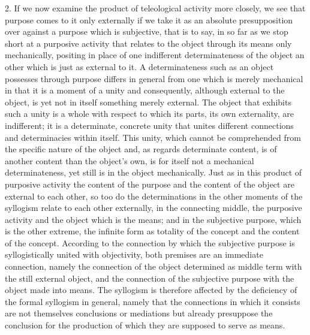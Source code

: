 2. If we now examine the product of
teleological activity more closely,
we see that purpose comes to it only externally
if we take it as an absolute presupposition
over against a purpose which is subjective,
that is to say, in so far as
we stop short at a purposive activity
that relates to the object
through its means only mechanically,
positing in place of one indifferent
determinateness of the object an other
which is just as external to it.
A determinateness such as an object
possesses through purpose differs in
general from one which is merely mechanical
in that it is a moment of
a unity and consequently,
although external to the object,
is yet not in itself
something merely external.
The object that exhibits such a unity is
a whole with respect to which its parts,
its own externality, are indifferent;
it is a determinate, concrete unity that
unites different connections and
determinacies within itself.
This unity, which cannot be comprehended
from the specific nature of the object
and, as regards determinate content,
is of another content than the object's own,
is for itself not a mechanical determinateness,
yet still is in the object mechanically.
Just as in this product of purposive activity
the content of the purpose
and the content of the object are
external to each other,
so too do the determinations in
the other moments of  the syllogism
relate to each other externally,
in the connecting middle,
the purposive activity
and the object which is the means;
and in the subjective purpose,
which is the other extreme,
the infinite form as totality of the concept
and the content of the concept.
According to the connection by which
the subjective purpose is
syllogistically united with objectivity,
both premises are an immediate connection,
namely the connection of the object
determined as middle term with
the still external object,
and the connection of the subjective purpose
 with the object made into means.
The syllogism is therefore affected by
the deficiency of the formal syllogism in general,
namely that the connections
in which it consists are not
themselves conclusions or mediations
but already presuppose the conclusion
for the production of which they are
supposed to serve as means.


